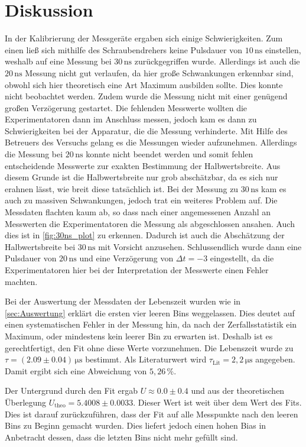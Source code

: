 \section{Diskussion}
\label{sec:Diskussion}

In der Kalibrierung der Messgeräte ergaben sich einige Schwierigkeiten.
Zum einen ließ sich mithilfe des Schraubendrehers keine Pulsdauer von $10 \, \unit{\nano\second}$ einstellen, weshalb auf eine Messung bei $30 \, \unit{\nano\second}$ zurückgegriffen wurde.
Allerdings ist auch die $20 \, \unit{\nano\second}$ Messung nicht gut verlaufen, da hier große Schwankungen erkennbar sind, obwohl sich hier theoretisch eine Art Maximum ausbilden sollte.
Dies konnte nicht beobachtet werden.
Zudem wurde die Messung nicht mit einer genügend großen Verzögerung gestartet.
Die fehlenden Messwerte wollten die Experimentatoren dann im Anschluss messen, jedoch kam es dann zu Schwierigkeiten bei der Apparatur, die die Messung verhinderte.
Mit Hilfe des Betreuers des Versuchs gelang es die Messungen wieder aufzunehmen.
Allerdings die Messung bei $20 \, \unit{\nano\second}$ konnte nicht beendet werden und somit fehlen entscheidende Messwerte zur exakten Bestimmung der Halbwertsbreite.
Aus diesem Grunde ist die Halbwertsbreite nur grob abschätzbar, da es sich nur erahnen lässt, wie breit diese tatsächlich ist.
Bei der Messung zu $30 \, \unit{\nano\second}$ kam es auch zu massiven Schwankungen, jedoch trat ein weiteres Problem auf.
Die Messdaten flachten kaum ab, so dass nach einer angemessenen Anzahl an Messwerten die Experimentatoren die Messung als abgeschlossen ansahen.
Auch dies ist in \autoref{fig:30ns_plot} zu erkennen.
Dadurch ist auch die Abschätzung der Halbwertsbreite bei $30 \, \unit{\nano\second}$ mit Vorsicht anzusehen.
Schlussendlich wurde dann eine Pulsdauer von $20 \, \unit{\nano\second}$ und eine Verzögerung von $\Delta t = -3$ eingestellt, da die Experimentatoren hier bei der Interpretation der Messwerte einen Fehler machten.

Bei der Auswertung der Messdaten der Lebenszeit wurden wie in \autoref{sec:Auswertung} erklärt die ersten vier leeren Bins weggelassen.
Dies deutet auf einen systematischen Fehler in der Messung hin, da nach der Zerfallsstatistik ein Maximum, oder mindestens kein leerer Bin zu erwarten ist.
Deshalb ist es gerechtfertigt, den Fit ohne diese Werte vorzunehmen.
Die Lebenszeit wurde zu $\tau = (2.09\pm 0.04) \, \unit{\micro\second}$ bestimmt.
Als Literaturwert wird $\tau_\text{Lit} = 2,2 \, \unit{\micro\second}$ angegeben.
Damit ergibt sich eine Abweichung von $5,26 \, \% $.

Der Untergrund durch den Fit ergab $U \approx 0.0 \pm 0.4$ und aus der theoretischen Überlegung $U_\text{theo} = 5.4008 \pm 0.0033$.
Dieser Wert ist weit über dem Wert des Fits.
Dies ist darauf zurückzuführen, dass der Fit auf alle Messpunkte nach den leeren Bins zu Beginn gemacht wurden.
Dies liefert jedoch einen hohen Bias in Anbetracht dessen, dass die letzten Bins nicht mehr gefüllt sind.